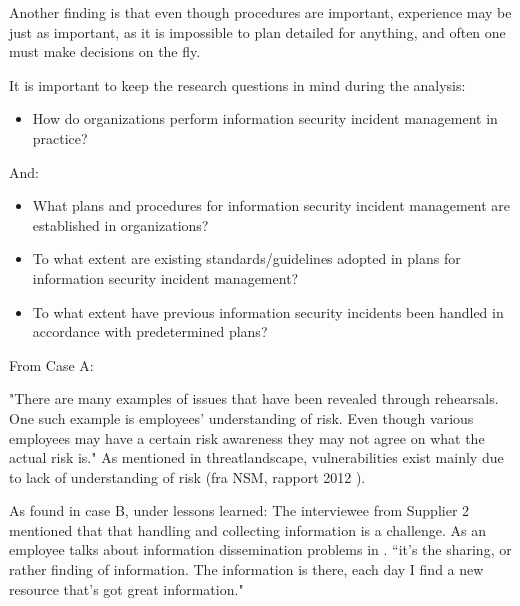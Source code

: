Another finding is that even though procedures are important, experience may be just as important, as it is impossible to plan detailed for anything, and often one must make decisions on the fly.

It is important to keep the research questions in mind during the analysis:

\begin{itemize}
\item How do organizations perform information security incident management in practice?
\end{itemize}

And:

\begin{itemize}\itemsep-0.1cm
\item What plans and procedures for information security incident management are established in organizations?
\item To what extent are existing standards/guidelines adopted in plans for information security incident management?
\item To what extent have previous information security incidents been handled in accordance with predetermined plans? 
\end{itemize}

From Case A:

"There are many examples of issues that have been revealed through rehearsals. One such example is employees' understanding of risk. Even though various employees may have a certain risk awareness they may not agree on what the actual risk is."
As mentioned in threatlandscape, vulnerabilities exist mainly due to lack of understanding of risk (fra NSM, rapport 2012 \cite{NSMRapport2012}).

As found in case B, under lessons learned:
The interviewee from Supplier 2 mentioned that that handling and collecting information is a challenge. As an employee talks about information dissemination problems in \cite{ahmad2012incident}.
``it's the sharing, or rather finding of information. The information is there, each day I find a new resource that's got great information."

